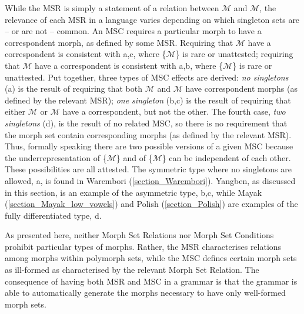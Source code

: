 While the MSR is simply a statement of a relation between $\mathcal{M}$ and $\mathcal{M}$, the relevance of each MSR in a language varies depending on which singleton sets are -- or are not -- common. {An MSC  requires  a particular  morph to have a correspondent morph, as defined by some MSR. Requiring that $\mathcal{M}$ have a correspondent is consistent with a,c, where \{$\mathcal{M}$\} is rare or unattested; requiring that $\mathcal{M}$ have a correspondent is consistent with a,b, where \{$\mathcal{M}$\} is rare or unattested. Put together, three types of MSC effects are derived: {\it no singletons} (a) is the result of requiring that both $\mathcal{M}$ and $\mathcal{M}$ have correspondent morphs (as defined by the relevant MSR); {\it one singleton} (b,c) is the result of  requiring that either $\mathcal{M}$ or $\mathcal{M}$ have a correspondent, but not the other. The fourth case, {\it two singletons} (d), is the result of no related MSC, so there is no requirement that  the morph set contain corresponding morphs (as defined by the relevant MSR).} Thus, formally speaking there are two possible versions of a given MSC because the underrepresentation of \{$\mathcal{M}$\} and of \{$\mathcal{M}$\} can be independent of each other. %
These possibilities are all attested. The symmetric type where no singletons are allowed, a, is found in Warembori (\textsection\ref{section_Warembori}). Yangben, as discussed in this section, is an example of the asymmetric type, b,c, while Mayak (\textsection\ref{section_Mayak_low_vowels}) and Polish (\textsection\ref{section_Polish}) are examples of the fully differentiated type, d. 

As presented here, neither Morph Set Relations nor Morph Set Conditions prohibit particular types of morphs. Rather, the MSR characterises relations among morphs within polymorph sets, while the MSC  defines certain morph sets as ill-formed as characterised by the relevant Morph Set Relation. The consequence of having both MSR and MSC in a grammar is that the grammar is able to automatically generate the morphs necessary to have only well-formed  morph sets.


